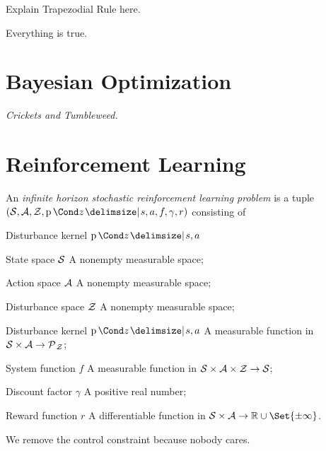 Explain Trapezodial Rule here.
\begin{theorem}
    Everything is true.
\end{theorem}


\section{Bayesian Optimization}
\label{sec:bayesian_optimization}
\emph{Crickets and Tumbleweed.}


\section{Reinforcement Learning}
\label{sec:reinforcement_learning:reinforcement_learning}
\parencite{bertsekas_stochastic_1978}

\begin{definition}
    An \emph{infinite horizon stochastic reinforcement learning problem} is a tuple $(\Sc, \Ac, \Zc, \Prob{z \given s, a}, f, \gamma, r)$ consisting of
    \begin{labeling}{Disturbance kernel $\Prob{z \given s, a}$\quad}
        \item[State space $\mathcal{S}$] A nonempty measurable space;
        \item[Action space $\mathcal{A}$] A nonempty measurable space;
        \item[Disturbance space $\mathcal{Z}$] A nonempty measurable space;
        \item[Disturbance kernel $\Prob{z \given s, a}$] A measurable function in $\mathcal{S} \times \mathcal{A} \to \operatorname{\mathcal{P}\mkern1mu}_{\mathcal{Z}}$;
        \item[System function $f$] A measurable function in  $\mathcal{S} \times \mathcal{A} \times \mathcal{Z} \to \mathcal{S}$;
        \item[Discount factor $\gamma$] A positive real number;
        \item[Reward function $r$] A differentiable function in $\Sc \times \Ac \to \Rb \cup \Set{\pm \infty}$.
    \end{labeling}
\end{definition}
We remove the control constraint because nobody cares.


